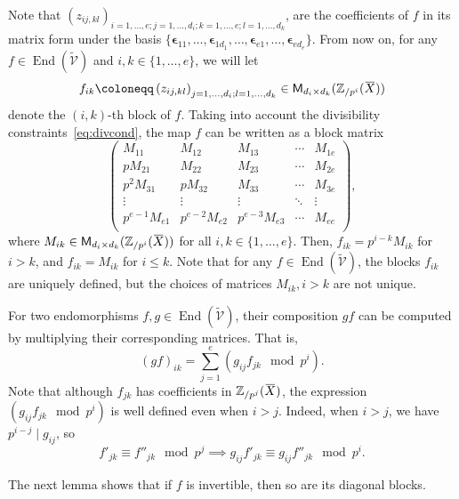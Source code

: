 \documentclass[letterpaper, 11pt, thm-restate]{article}
\numberwithin{equation}{section}
\newcommand{\Z}{\mathbb{Z}}
\newcommand{\Zpi}{\mathbb{Z}_{/p^i}}
\newcommand{\End}{\operatorname{End}}
\newcommand{\M}{\mathsf{M}}
\newcommand{\bepsilon}{\boldsymbol{\epsilon}}
\newcommand{\tmV}{\widetilde{\mathcal{V}}}
\newcommand{\oX}{\mkern 1.5mu\overline{\mkern-1.5mu X \mkern-1.5mu}\mkern 1.5mu}
\theoremstyle{definition}
\theoremstyle{definition}
\theoremstyle{definition}
\begin{document}
Note that $\left(z_{ij, kl}\right)_{i = 1, \ldots, e; j = 1, \ldots, d_i; k = 1, \ldots, e; l = 1, \ldots, d_k}$, are the coefficients of $f$ in its matrix form under the basis $\{\bepsilon_{11}, \ldots, \bepsilon_{1 d_1}, \ldots, \bepsilon_{e1}, \ldots, \bepsilon_{e d_e}\}$.
From now on, for any $f \in \End(\tmV)$ and $i,k \in \{1, \ldots, e\}$, we will let 
\[
f_{ik} \coloneqq \left(z_{ij, kl}\right)_{j = 1, \ldots, d_i; l = 1, \ldots, d_k} \in \M_{d_i \times d_k}(\Zpi(\oX))
\]
denote the $(i,k)$-th block of $f$.
Taking into account the divisibility constraints~\eqref{eq:divcond}, the map $f$ can be written as a block matrix
\begin{equation}\label{eq:deffinM}
    \begin{pmatrix}
        M_{11} & M_{12} & M_{13} & \cdots & M_{1e} \\
        p M_{21} & M_{22} & M_{23} & \cdots & M_{2e} \\
        p^2 M_{31} & p M_{32} & M_{33} & \cdots & M_{3e} \\
        \vdots & \vdots & \vdots & \ddots & \vdots \\
        p^{e-1} M_{e1} & p^{e-2} M_{e2} & p^{e-3} M_{e3} & \cdots & M_{ee} \\
    \end{pmatrix},
\end{equation}
where $M_{ik} \in \M_{d_i \times d_k}(\Zpi(\oX))$ for all $i,k \in \{1, \ldots, e\}$.
Then, $f_{ik} = p^{i-k} M_{ik}$ for $i > k$, and $f_{ik} = M_{ik}$ for $i \leq k$.
Note that for any $f \in \End(\tmV)$, the blocks $f_{ik}$ are uniquely defined, but the choices of matrices $M_{ik}, i > k$ are not unique.

For two endomorphisms $f, g \in \End(\tmV)$, their composition $g f$ can be computed by multiplying their corresponding matrices.
That is, 
\[
(g f)_{ik} = \sum_{j = 1}^e \left(g_{ij} f_{jk} \mod p^i \right).
\]
Note that although $f_{jk}$ has coefficients in $\Z_{/p^j}(\oX)$, the expression $\left(g_{ij} f_{jk} \mod p^i \right)$ is well defined even when $i > j$.
Indeed, when $i > j$, we have $p^{i-j} \mid g_{ij}$, so 
\[
f'_{jk} \equiv f''_{jk} \mod p^j \implies g_{ij} f'_{jk} \equiv g_{ij} f''_{jk} \mod p^i.
\]

The next lemma shows that if $f$ is invertible, then so are its diagonal blocks.
\end{document}

